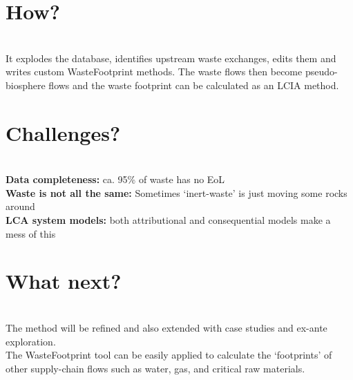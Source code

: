 \documentclass[a0paper,fleqn]{betterposter}
\begin{document}
{    \section{\hspace{2cm}How?}\\
It explodes the database, identifies upstream waste exchanges, edits them and writes custom WasteFootprint methods. The waste flows then become pseudo-biosphere flows and the waste footprint can be calculated as an LCIA method.

    \section{\hspace{2cm}Challenges?}\\
\textbf{Data completeness:} ca. 95\% of waste has no EoL\\
\textbf{Waste is not all the same:} Sometimes `inert-waste' is just moving some rocks around\\
 \textbf{LCA system models:} both attributional and consequential models make a mess of this

    \section{\hspace{2cm}What next?}\\
        The method will be refined and also extended with case studies and ex-ante exploration.\\
        The WasteFootprint tool can be easily applied to calculate the `footprints' of other supply-chain flows
        such as water, gas, and critical raw materials.

}
\end{document}
